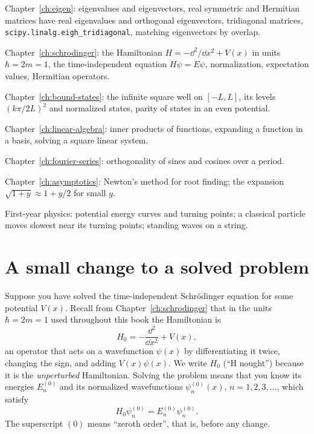 \begin{prerequisites}
\item Chapter~\ref{ch:eigen}: eigenvalues and eigenvectors, real symmetric and Hermitian matrices have real eigenvalues and orthogonal eigenvectors, tridiagonal matrices, \texttt{scipy.linalg.eigh\_tridiagonal}, matching eigenvectors by overlap.
\item Chapter~\ref{ch:schrodinger}: the Hamiltonian $H=-\dd^2/\dd x^2+V(x)$ in units $\hbar=2m=1$, the time-independent equation $H\psi=E\psi$, normalization, expectation values, Hermitian operators.
\item Chapter~\ref{ch:bound-states}: the infinite square well on $[-L,L]$, its levels $(k\pi/2L)^2$ and normalized states, parity of states in an even potential.
\item Chapter~\ref{ch:linear-algebra}: inner products of functions, expanding a function in a basis, solving a square linear system.
\item Chapter~\ref{ch:fourier-series}: orthogonality of sines and cosines over a period.
\item Chapter~\ref{ch:asymptotics}: Newton's method for root finding; the expansion $\sqrt{1+y}\approx 1+y/2$ for small $y$.
\item First-year physics: potential energy curves and turning points; a classical particle moves slowest near its turning points; standing waves on a string.
\end{prerequisites}

\section{A small change to a solved problem}\label{sec:perturbation-intro}

Suppose you have solved the time-independent Schr\"odinger equation for some potential $V(x)$. Recall from Chapter~\ref{ch:schrodinger} that in the units $\hbar=2m=1$ used throughout this book the Hamiltonian is
\begin{equation}
H_0=-\frac{\dd^2}{\dd x^2}+V(x),
\label{eq:perturbation-H0}
\end{equation}
an operator that acts on a wavefunction $\psi(x)$ by differentiating it twice, changing the sign, and adding $V(x)\psi(x)$. We write $H_0$ (``H nought'') because it is the \emph{unperturbed} Hamiltonian. Solving the problem means that you know its energies $E_n^{(0)}$ and its normalized wavefunctions $\psi_n^{(0)}(x)$, $n=1,2,3,\dots$, which satisfy
\begin{equation}
H_0\psi_n^{(0)}=E_n^{(0)}\psi_n^{(0)} .
\label{eq:perturbation-unperturbed}
\end{equation}
The superscript $(0)$ means ``zeroth order'', that is, before any change.

